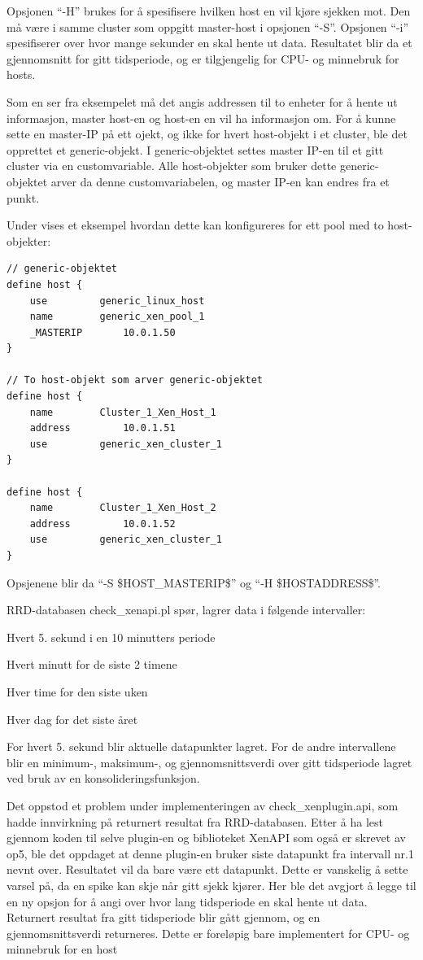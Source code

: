 Opsjonen ``-H'' brukes for å spesifisere hvilken host en vil kjøre sjekken mot. Den må være i samme cluster som oppgitt master-host i opsjonen ``-S''. Opsjonen ``-i'' spesifiserer over hvor mange sekunder en skal hente ut data. Resultatet blir da et gjennomsnitt for gitt tidsperiode, og er tilgjengelig for CPU- og minnebruk for hosts.

Som en ser fra eksempelet må det angis addressen til to enheter for å hente ut informasjon, master host-en og host-en en vil ha informasjon om. For å kunne sette en master-IP på ett ojekt, og ikke for hvert host-objekt i et cluster, ble det opprettet et generic-objekt. I generic-objektet settes master IP-en til et gitt cluster via en customvariable. Alle host-objekter som bruker dette generic-objektet arver da denne customvariabelen, og master IP-en kan endres fra et punkt.

Under vises et eksempel hvordan dette kan konfigureres for ett pool med to host-objekter:
\begin{lstlisting}[style=example]
// generic-objektet 
define host {
    use 		generic_linux_host
    name 		generic_xen_pool_1
    _MASTERIP 		10.0.1.50
}

// To host-objekt som arver generic-objektet
define host {
    name 		Cluster_1_Xen_Host_1
    address 		10.0.1.51
    use 		generic_xen_cluster_1
}

define host {
    name 		Cluster_1_Xen_Host_2
    address 		10.0.1.52
    use 		generic_xen_cluster_1
}
\end{lstlisting}

Opsjenene blir da ``-S \$HOST\_MASTERIP\$'' og ``-H \$HOSTADDRESS\$''.

RRD-databasen check\_xenapi.pl spør, lagrer data i følgende intervaller:
\begin{enumerate*}
        \item Hvert 5. sekund i en 10 minutters periode
        \item Hvert minutt for de siste 2 timene
	\item Hver time for den siste uken
        \item Hver dag for det siste året
\end{enumerate*}

For hvert 5. sekund blir aktuelle datapunkter lagret. For de andre intervallene blir en minimum-, maksimum-, og gjennomsnittsverdi over gitt tidsperiode lagret ved bruk av en konsolideringsfunksjon. \cite{xenrrd}

Det oppstod et problem under implementeringen av check\_xenplugin.api, som hadde innvirkning på returnert resultat fra RRD-databasen. Etter å ha lest gjennom koden til selve plugin-en og biblioteket XenAPI som også er skrevet av op5, ble det oppdaget at denne plugin-en bruker siste datapunkt fra intervall nr.1 nevnt over. Resultatet vil da bare være ett datapunkt. Dette er vanskelig å sette varsel på, da en spike kan skje når gitt sjekk kjører. Her ble det avgjort å legge til en ny opsjon for å angi over hvor lang tidsperiode en skal hente ut data. Returnert resultat fra gitt tidsperiode blir gått gjennom, og en gjennomsnittsverdi returneres. Dette er foreløpig bare implementert for CPU- og minnebruk for en host

